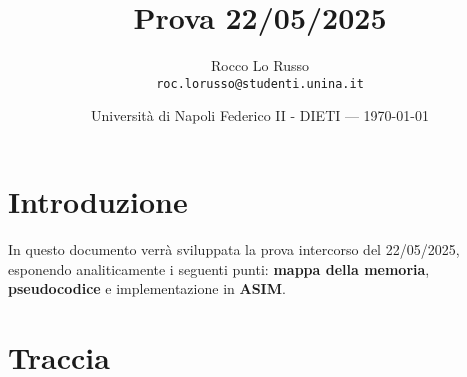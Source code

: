 \documentclass{article}
\title{Prova 22/05/2025} %
\author{Rocco Lo Russo\\ \texttt{roc.lorusso@studenti.unina.it}} %
\date{Università di Napoli Federico II - DIETI --- \today} %
\begin{document}
\maketitle %


\section*{Introduzione} %
In questo documento verrà sviluppata la prova intercorso del 22/05/2025, esponendo analiticamente i seguenti punti: \textbf{mappa della memoria}, \textbf{pseudocodice} e implementazione in \textbf{ASIM}.





\section{Traccia} \label{sec:traccia}%
\end{document}
